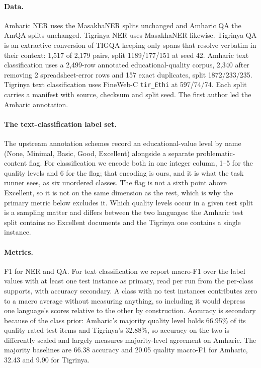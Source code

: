 \documentclass[11pt]{article}
\begin{document}
\paragraph{Data.} Amharic NER uses the MasakhaNER splits
\citep{adelani-etal-2021-masakhaner} unchanged and Amharic QA the AmQA splits
\citep{taffa-etal-2024-amqa} unchanged. Tigrinya NER uses MasakhaNER
likewise. Tigrinya QA is an extractive conversion of TIGQA keeping only spans
that resolve verbatim in their context: 1{,}517 of 2{,}179 pairs, split
1189/177/151 at seed 42. Amharic text classification uses a 2{,}499-row
annotated educational-quality corpus, 2{,}340 after removing 2
spreadsheet-error rows and 157 exact duplicates, split 1872/233/235. Tigrinya
text classification uses FineWeb-C \texttt{tir\_Ethi} at 597/74/74. Each
split carries a manifest with source, checksum and split seed. The first
author led the Amharic annotation.

\paragraph{The text-classification label set.} The upstream annotation
schemes record an educational-value level by name (None, Minimal, Basic,
Good, Excellent) alongside a separate problematic-content flag. For
classification we encode both in one integer column, 1--5 for the quality
levels and 6 for the flag; that encoding is ours, and it is what the task
runner sees, as six unordered classes. The flag is not a sixth point above
Excellent, so it is not on the same dimension as the rest, which is why the
primary metric below excludes it. Which quality levels occur in a given test
split is a sampling matter and differs between the two languages: the
Amharic test split contains no Excellent documents and the Tigrinya one
contains a single instance.

\paragraph{Metrics.} F1 for NER and QA. For text classification we report
macro-F1 over the label values with at least one test instance as primary,
read per run from the per-class supports, with accuracy secondary. A class
with no test instances contributes zero to a macro average without measuring
anything, so including it would depress one language's scores relative to the
other by construction. Accuracy is secondary because of the class prior:
Amharic's majority quality level holds 66.95\% of its quality-rated test
items and Tigrinya's 32.88\%, so accuracy on the two is differently scaled
and largely measures majority-level agreement on Amharic. The majority
baselines are 66.38 accuracy and 20.05 quality macro-F1 for Amharic, 32.43
and 9.90 for Tigrinya.
\end{document}
